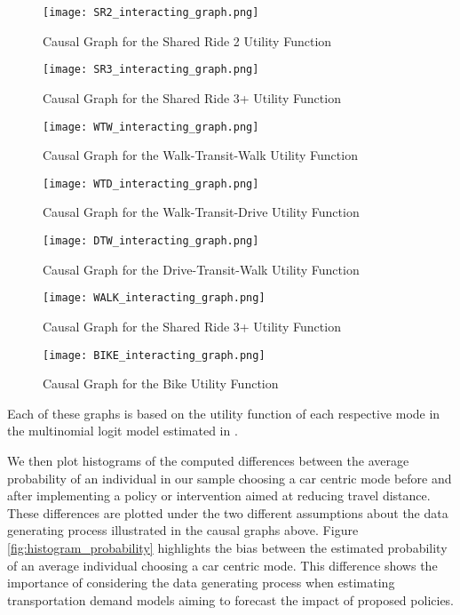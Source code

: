 \begin{figure}
   \centering
   \texttt{[image: SR2\_interacting\_graph.png]}
   \caption{Causal Graph for the Shared Ride 2 Utility Function}
   \label{fig:SR2_causal_2}
\end{figure}

\begin{figure}
   \centering
   \texttt{[image: SR3\_interacting\_graph.png]}
   \caption{Causal Graph for the Shared Ride 3+ Utility Function}
   \label{fig:SR3_causal_2}
\end{figure}

\begin{figure}
   \centering
   \texttt{[image: WTW\_interacting\_graph.png]}
   \caption{Causal Graph for the Walk-Transit-Walk Utility Function}
   \label{fig:WTW_causal_2}
\end{figure}

\begin{figure}
   \centering
   \texttt{[image: WTD\_interacting\_graph.png]}
   \caption{Causal Graph for the Walk-Transit-Drive Utility Function}
   \label{fig:WTD_causal_2}
\end{figure}

\begin{figure}
   \centering
   \texttt{[image: DTW\_interacting\_graph.png]}
   \caption{Causal Graph for the Drive-Transit-Walk Utility Function}
   \label{fig:DTW_causal_2}
\end{figure}

\begin{figure}
   \centering
   \texttt{[image: WALK\_interacting\_graph.png]}
   \caption{Causal Graph for the Shared Ride 3+ Utility Function}
   \label{fig:WALK_causal_2}
\end{figure}

\begin{figure}
   \centering
   \texttt{[image: BIKE\_interacting\_graph.png]}
   \caption{Causal Graph for the Bike Utility Function}
   \label{fig:BIKE_causal_2}
\end{figure}

Each of these graphs is based on the utility function of each respective mode in the multinomial logit model estimated in \citet{brathwaite-asymmetric}.

We then plot histograms of the computed differences between the average probability of an individual
in our sample choosing a car centric mode before and after implementing a policy or intervention
aimed at reducing travel distance.
These differences are plotted under the two different assumptions about the data generating process illustrated in the causal graphs above.
Figure \ref{fig:histogram_probability} highlights the bias between the estimated probability of an average individual choosing a car centric mode.
This difference shows the importance of considering the data generating process when estimating transportation demand models aiming to forecast the impact of proposed policies.

